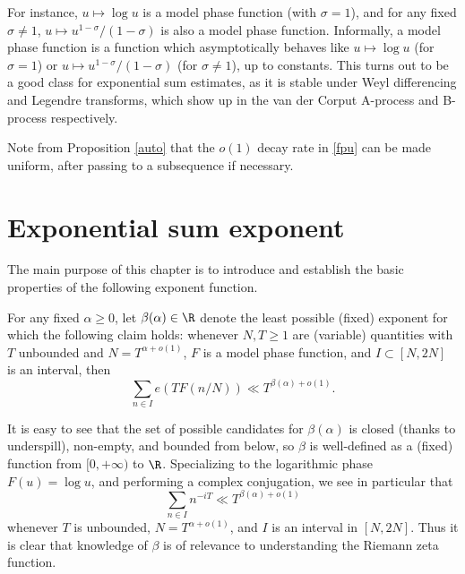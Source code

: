 For instance, $u \mapsto \log u$ is a model phase function (with $\sigma=1$), and for any fixed $\sigma \neq 1$, $u \mapsto u^{1-\sigma}/(1-\sigma)$ is also a model phase function.  Informally, a model phase function is a function which asymptotically behaves like $u \mapsto \log u$ (for $\sigma = 1$) or $u \mapsto u^{1-\sigma}/(1-\sigma)$ (for $\sigma \neq 1$), up to constants.  This turns out to be a good class for exponential sum estimates, as it is stable under Weyl differencing and Legendre transforms, which show up in the van der Corput A-process and B-process respectively.

Note from Proposition \ref{auto} that the $o(1)$ decay rate in \eqref{fpu} can be made uniform, after passing to a subsequence if necessary.

\section{Exponential sum exponent}

The main purpose of this chapter is to introduce and establish the basic properties of the following exponent function.

\begin{definition}\label{beta-def}
\leanok
For any fixed $\alpha \geq 0$, let $\beta(\alpha) \in \R$ denote the least possible (fixed) exponent for which the following claim holds: whenever $N, T \geq 1$ are (variable) quantities with $T$ unbounded and $N = T^{\alpha+o(1)}$, $F$ is a model phase function, and $I \subset [N, 2N]$ is an interval, then
$$ \sum_{n \in I} e(T F(n/N)) \ll T^{\beta(\alpha)+o(1)}.$$
\end{definition}


It is easy to see that the set of possible candidates for $\beta(\alpha)$ is closed (thanks to underspill), non-empty, and bounded from below, so $\beta$ is well-defined as a (fixed) function from $[0,+\infty)$ to $\R$.  Specializing to the logarithmic phase $F(u) = \log u$, and performing a complex conjugation, we see in particular that
\begin{equation}\label{beta-alpha}
    \sum_{n \in I} n^{-iT} \ll T^{\beta(\alpha)+o(1)}
\end{equation}
whenever $T$ is unbounded, $N = T^{\alpha+o(1)}$, and $I$ is an interval in $[N,2N]$.  Thus it is clear that knowledge of $\beta$ is of relevance to understanding the Riemann zeta function.


